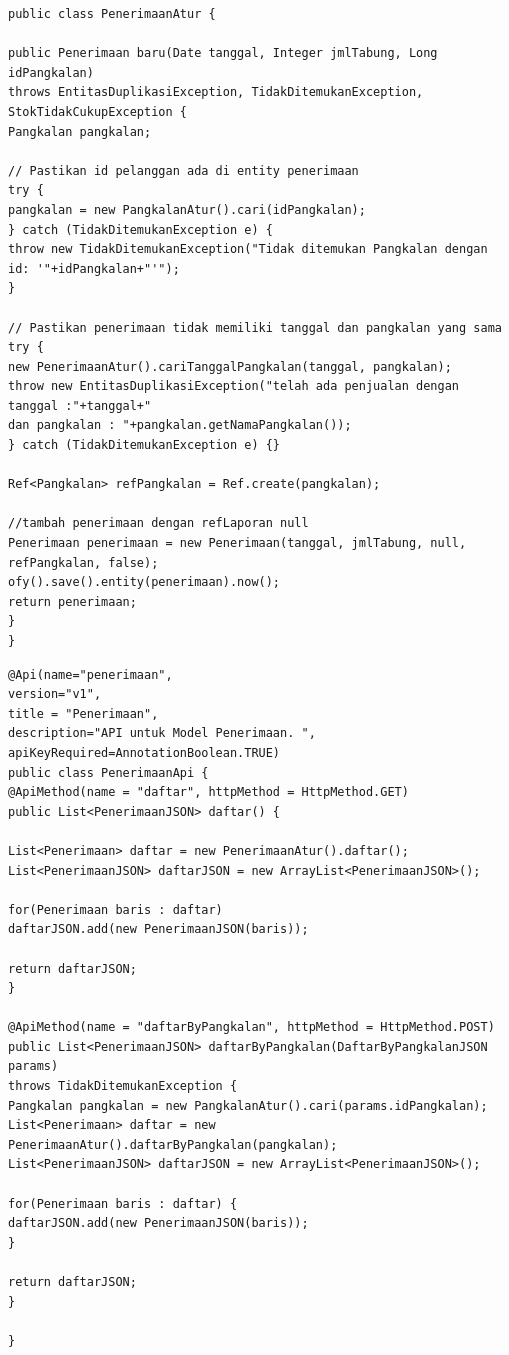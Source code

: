 \begin{lstlisting}[caption=Potongan kode \textit{controller} layanan web, label=controllerWebservice]
public class PenerimaanAtur {

public Penerimaan baru(Date tanggal, Integer jmlTabung, Long idPangkalan) 
throws EntitasDuplikasiException, TidakDitemukanException, StokTidakCukupException {
Pangkalan pangkalan;

// Pastikan id pelanggan ada di entity penerimaan
try {
pangkalan = new PangkalanAtur().cari(idPangkalan);
} catch (TidakDitemukanException e) {
throw new TidakDitemukanException("Tidak ditemukan Pangkalan dengan id: '"+idPangkalan+"'");
}

// Pastikan penerimaan tidak memiliki tanggal dan pangkalan yang sama
try {
new PenerimaanAtur().cariTanggalPangkalan(tanggal, pangkalan);
throw new EntitasDuplikasiException("telah ada penjualan dengan tanggal :"+tanggal+"
dan pangkalan : "+pangkalan.getNamaPangkalan());
} catch (TidakDitemukanException e) {}

Ref<Pangkalan> refPangkalan = Ref.create(pangkalan);

//tambah penerimaan dengan refLaporan null
Penerimaan penerimaan = new Penerimaan(tanggal, jmlTabung, null, refPangkalan, false);
ofy().save().entity(penerimaan).now();
return penerimaan;
}
}

\end{lstlisting}	

\begin{lstlisting}[caption=Potongan kode API layanan web, label=apiWebservice]
@Api(name="penerimaan",
version="v1",
title = "Penerimaan",
description="API untuk Model Penerimaan. ",
apiKeyRequired=AnnotationBoolean.TRUE)
public class PenerimaanApi {
@ApiMethod(name = "daftar", httpMethod = HttpMethod.GET)
public List<PenerimaanJSON> daftar() {

List<Penerimaan> daftar = new PenerimaanAtur().daftar();
List<PenerimaanJSON> daftarJSON = new ArrayList<PenerimaanJSON>();

for(Penerimaan baris : daftar)
daftarJSON.add(new PenerimaanJSON(baris));

return daftarJSON;
}

@ApiMethod(name = "daftarByPangkalan", httpMethod = HttpMethod.POST)
public List<PenerimaanJSON> daftarByPangkalan(DaftarByPangkalanJSON params) 
throws TidakDitemukanException {
Pangkalan pangkalan = new PangkalanAtur().cari(params.idPangkalan);
List<Penerimaan> daftar = new PenerimaanAtur().daftarByPangkalan(pangkalan);
List<PenerimaanJSON> daftarJSON = new ArrayList<PenerimaanJSON>();

for(Penerimaan baris : daftar) {
daftarJSON.add(new PenerimaanJSON(baris));
}

return daftarJSON;
}

}

\end{lstlisting}

